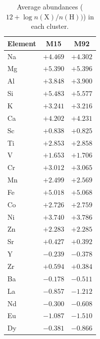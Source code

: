 \begin{table}[h!]
\caption{Average abundances ($12 + \log n({\mathrm X})/n({\mathrm H}))$) in each cluster.}\label{tab:avgabund}
\begin{tabular}{lcc}
\toprule
Element & M15 & M92 \\ \midrule
Na & $+4.469$ & $+4.302$ \\ 
Mg & $+5.390$ & $+5.396$ \\ 
Al & $+3.848$ & $+3.900$ \\ 
Si & $+5.483$ & $+5.577$ \\ 
K & $+3.241$ & $+3.216$ \\ 
Ca & $+4.202$ & $+4.231$ \\ 
Sc & $+0.838$ & $+0.825$ \\ 
Ti & $+2.853$ & $+2.858$ \\ 
V & $+1.653$ & $+1.706$ \\ 
Cr & $+3.012$ & $+3.065$ \\ 
Mn & $+2.499$ & $+2.569$ \\ 
Fe & $+5.018$ & $+5.068$ \\ 
Co & $+2.726$ & $+2.759$ \\ 
Ni & $+3.740$ & $+3.786$ \\ 
Zn & $+2.283$ & $+2.285$ \\ 
Sr & $+0.427$ & $+0.392$ \\ 
Y & $-0.239$ & $-0.378$ \\ 
Zr & $+0.594$ & $+0.384$ \\ 
Ba & $-0.178$ & $-0.511$ \\ 
La & $-0.857$ & $-1.212$ \\ 
Nd & $-0.300$ & $-0.608$ \\ 
Eu & $-1.087$ & $-1.510$ \\ 
Dy & $-0.381$ & $-0.866$ \\ 
\bottomrule
\end{tabular}
\end{table}